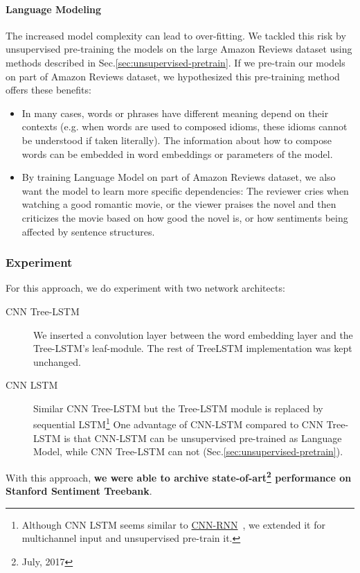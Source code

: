 \paragraph{Language Modeling}
The increased model complexity can lead to over-fitting.
We tackled this risk by unsupervised pre-training the models on the large Amazon Reviews dataset using methods described in Sec.\ref{sec:unsupervised-pretrain}.
If we pre-train our models on part of Amazon Reviews dataset, we hypothesized this pre-training method offers these benefits:
\begin{itemize}
\item In many cases, words or phrases have different meaning depend on their contexts (e.g. when words are used to composed idioms, these idioms cannot be understood if taken literally).
The information about how to compose words can be embedded in word embeddings or parameters of the model.
\item By training Language Model on part of Amazon Reviews dataset, we also want the model to learn more specific dependencies: The reviewer cries when watching a good romantic movie, or the viewer praises the novel and then criticizes the movie based on how good the novel is, or how sentiments being affected by sentence structures.
\end{itemize}

\subsubsection{Experiment}
For this approach, we do experiment with two network architects:
\begin{description}
\item[CNN Tree-LSTM] We inserted a convolution layer between the word embedding layer and the Tree-LSTM's leaf-module.
The rest of TreeLSTM implementation was kept unchanged.

\item[CNN LSTM] Similar CNN Tree-LSTM but the Tree-LSTM module is replaced by sequential LSTM\footnote{Although CNN LSTM seems similar to \hyperref[cnn-rnn]{CNN-RNN}~\cite{cnn-rnn}, we extended it for multichannel input and unsupervised pre-train it.}
One advantage of CNN-LSTM compared to CNN Tree-LSTM is that CNN-LSTM can be unsupervised pre-trained as Language Model, while CNN Tree-LSTM can not (Sec.\ref{sec:unsupervised-pretrain}).
\end{description}

With this approach, \textbf{we were able to archive state-of-art\footnote{July, 2017} performance on Stanford Sentiment Treebank}.


